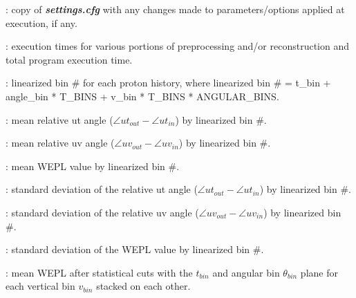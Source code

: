\documentclass[landscape,12pt]{article}
\begin{document}
\begin{myEnumerate}[labelindent=1pt, leftmargin=*]
\begin{myEnumerate}[labelindent=1pt, leftmargin=*]
\begin{myEnumerate}[labelindent=1pt, leftmargin=*]
\begin{myEnumerate}[labelindent=1pt, leftmargin=*]
\begin{myEnumerate}[labelindent=1pt, leftmargin=*]
\begin{myEnumerate}[labelindent=1pt, leftmargin=*]
\begin{myEnumerate}[labelindent=1pt, leftmargin=*]
\begin{myEnumerate}[labelindent=1pt, leftmargin=*]
                                    \begin{myEnumerate}[labelindent=1pt, leftmargin=*]
                                        \item {} \color{Black}: copy of \textbf{\textit{settings.cfg}} with any changes made to parameters/options applied at execution, if any.
                                        \item {} \color{Black}: execution times for various portions of preprocessing and/or reconstruction and total program execution time.
                                        \item {} \color{Black}: linearized bin \# for each proton history, where linearized bin \# = t\_bin + angle\_bin * T\_BINS + v\_bin * T\_BINS * ANGULAR\_BINS.\\
                                        \item { \color{Black}: mean relative ut angle ($\angle ut_{out} -\angle ut_{in}$) by linearized bin \#.}\\
                                        \item {} \color{Black}: mean relative uv angle ($\angle uv_{out} -\angle uv_{in}$) by linearized bin \#.
                                        \item {} \color{Black}: mean WEPL value by linearized bin \#.
                                        \item {} \color{Black}: standard deviation of the relative ut angle ($\angle ut_{out} -\angle ut_{in}$) by linearized bin \#.
                                        \item {} \color{Black}: standard deviation of the relative uv angle ($\angle uv_{out} -\angle uv_{in}$) by linearized bin \#.
                                        \item {} \color{Black}: standard deviation of the WEPL value by linearized bin \#.
                                        \item {} \color{Black}: mean WEPL after statistical cuts with the $t_{bin}$ and angular bin $\theta_{bin}$ plane for each vertical bin $v_{bin}$ stacked on each other.

\end{myEnumerate}
\end{myEnumerate}
\end{myEnumerate}
\end{myEnumerate}
\end{myEnumerate}
\end{myEnumerate}
\end{myEnumerate}
\end{myEnumerate}
\end{myEnumerate}
\end{document}
